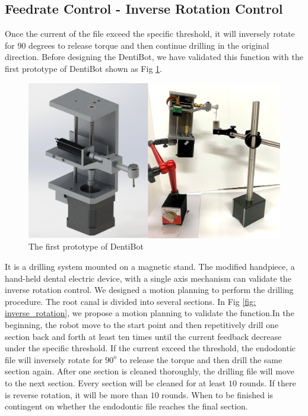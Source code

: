 \subsection{Feedrate Control - Inverse Rotation Control}
\label{sec:Inver Rotation Control}
\hspace*{6mm} Once the current of the file exceed the specific threshold, it will inversely rotate for 90 degrees to release torque and then continue drilling in the original direction. Before designing the DentiBot, we have validated this function with the first prototype of DentiBot shown as Fig \ref{fig: prototype}.
\begin{figure}[htbp]
\begin{center}
\includegraphics[width=1\linewidth]{Images/Prototype.png}
\caption{The first prototype of DentiBot
}\label{fig: prototype}
\end{center}
\end{figure}	
\par
It is a drilling system mounted on a magnetic
stand. The modified handpiece, a hand-held dental electric device, with a single axis mechanism can validate the inverse rotation control. We designed a motion planning to perform the drilling procedure. The root canal is divided into several sections. In Fig \ref{fig: inverse_rotation}, we propose a motion planning to validate the function.In the beginning, the robot move to the start point and then repetitively drill one section back and forth at least ten times until the current feedback decrease under the specific threshold. If the current exceed the threshold, the endodontic file will inversely rotate for $90^o$ to release the torque and then drill the same section again. After one section is cleaned thoroughly, the drilling file will move to the next section. Every section will be cleaned for at least $10$ rounds. If there is reverse rotation, it will be more than $10$ rounds. When to be finished is contingent on whether the endodontic file reaches the final section.
